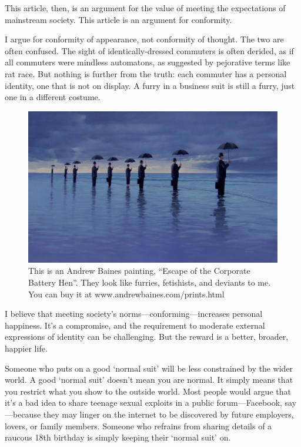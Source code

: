 This article, then, is an argument for the value of meeting the expectations of mainstream society. This article is an argument for conformity.

I argue for conformity of appearance, not conformity of thought. The two are often confused. The sight of identically-dressed commuters is often derided, as if all commuters were mindless automatons, as suggested by pejorative terms like rat race. But nothing is further from the truth: each commuter has a personal identity, one that is not on display. A furry in a business suit is still a furry, just one in a different costume.

\begin{figure}
  \begin{center}
    \includegraphics[width=\textwidth]{content/assets/conformity--escape}
  \end{center}
  \caption{This is an Andrew Baines painting, ``Escape of the Corporate Battery Hen''. They look like furries, fetishists, and deviants to me. You can buy it at www.andrewbaines.com/prints.html}
\end{figure}

I believe that meeting society's norms—conforming—increases personal happiness. It's a compromise, and the requirement to moderate external expressions of identity can be challenging. But the reward is a better, broader, happier life.

Someone who puts on a good `normal suit' will be less constrained by the wider world. A good `normal suit' doesn't mean you are normal. It simply means that you restrict what you show to the outside world. Most people would argue that it's a bad idea to share teenage sexual exploits in a public forum—Facebook, say—because they may linger on the internet to be discovered by future employers, lovers, or family members. Someone who refrains from sharing details of a raucous 18th birthday is simply keeping their `normal suit' on.

